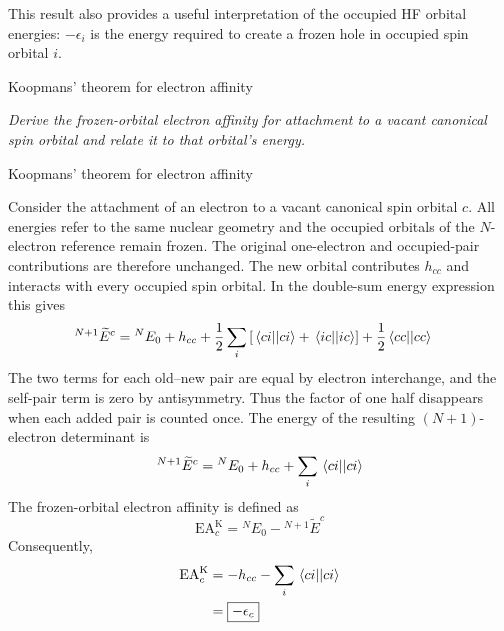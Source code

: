\documentclass[11pt,a4paper,titlepage]{article}
\numberwithin{equation}{section}
\newcommand{\violet}[1]{\textcolor{hfViolet}{#1}}
\begin{document}
This result also provides a useful interpretation of the occupied HF
orbital energies: $-\epsilon_i$ is the energy required to create a frozen
hole in occupied spin orbital $i$.


\begin{hfexercise}{Koopmans' theorem for electron affinity}

\violet{\textit{Derive the frozen-orbital electron affinity for attachment
to a vacant canonical spin orbital and relate it to that orbital's energy.}}

\end{hfexercise}
\begin{hfsolution}{Koopmans' theorem for electron affinity}

Consider the attachment of an electron to a vacant canonical spin orbital
$c$. All energies refer to the same nuclear geometry and the occupied
orbitals of the $N$-electron reference remain frozen. The original
one-electron and occupied-pair contributions are therefore unchanged.
The new orbital contributes $h_{cc}$ and interacts with every occupied
spin orbital. In the double-sum energy expression this gives
\begin{equation}
\begin{split}
  {}^{N+1}\widetilde E^c
  &={}^N E_0+h_{cc}
    +\frac12\sum_i\qty[\mel{ci}{}{ci}+\mel{ic}{}{ic}]
    +\frac12\mel{cc}{}{cc}
\end{split}
\end{equation}
The two terms for each old--new pair are equal by electron interchange,
and the self-pair term is zero by antisymmetry. Thus the factor of one
half disappears when each added pair is counted once. The energy of the resulting
$(N+1)$-electron determinant is
\begin{equation}
  {}^{N+1}\widetilde{E}^{c}
  =
  {}^N E_0
  +
  h_{cc}
  +
  \sum_i
  \mel{ci}{}{ci}
\end{equation}
The frozen-orbital electron affinity is defined as
\begin{equation}
  \text{EA}_c^\text{K}
  =
  {}^N E_0
  -
  {}^{N+1}\widetilde{E}^{c}
\end{equation}
Consequently,
\begin{equation}
\begin{split}
  \text{EA}_c^\text{K}
  &=
  -h_{cc}
  -
  \sum_i
  \mel{ci}{}{ci}
  \\
  &=
  \boxed{-\epsilon_c}
  \label{eq:koopmans-ea}
\end{split}
\end{equation}


\end{hfsolution}
\end{document}

